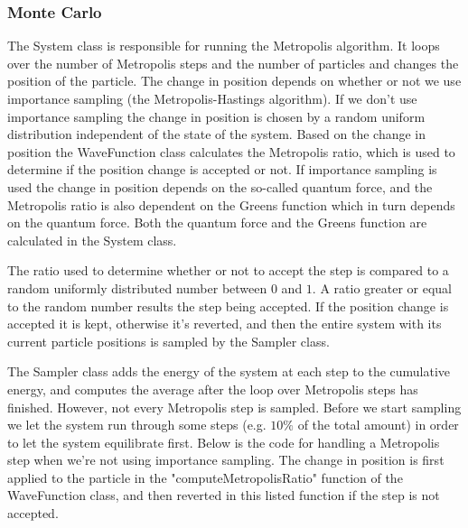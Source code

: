 \documentclass[../main.tex]{subfiles}
\begin{document}
\subsubsection{Monte Carlo}

The System class is responsible for running the Metropolis algorithm. It loops over the number of Metropolis steps and the number of particles and changes the position of the particle. The change in position depends on whether or not we use importance sampling (the Metropolis-Hastings algorithm). If we don't use importance sampling the change in position is chosen by a random uniform distribution independent of the state of the system. Based on the change in position the WaveFunction class calculates the Metropolis ratio, which is used to determine if the position change is accepted or not. If importance sampling is used the change in position depends on the so-called quantum force, and the Metropolis ratio is also dependent on the Greens function which in turn depends on the quantum force. Both the quantum force and the Greens function are calculated in the System class. 

The ratio used to determine whether or not to accept the step is compared to a random uniformly distributed number between $0$ and $1$. A ratio greater or equal to the random number results the step being accepted. If the position change is accepted it is kept, otherwise it's reverted, and then the entire system with its current particle positions is sampled by the Sampler class. 

The Sampler class adds the energy of the system at each step to the cumulative energy, and computes the average after the loop over Metropolis steps has finished. However, not every Metropolis step is sampled. Before we start sampling we let the system run through some steps (e.g. $10\%$ of the total amount) in order to let the system equilibrate first. Below is the code for handling a Metropolis step when we're not using importance sampling. The change in position is first applied to the particle in the "computeMetropolisRatio" function of the WaveFunction class, and then reverted in this listed function if the step is not accepted.
\end{document}
